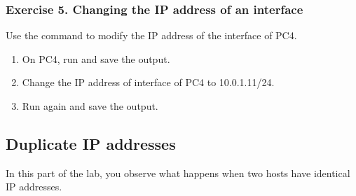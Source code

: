 \subsubsection*{Exercise 5. Changing the IP address of an interface}

Use the  command to modify the IP address of the  interface of PC4.
\begin{enumerate}
	\item On PC4, run  and save the output.
	\item Change the IP address of interface  of PC4 to 10.0.1.11/24.
	\item Run  again and save the output.
\end{enumerate}

\begin{questions}
\end{questions}
	
\newpage
\subsection{Duplicate IP addresses}
In this part of the lab, you observe what happens when two hosts have identical IP addresses.


